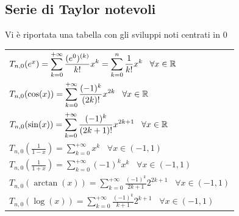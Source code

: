 \documentclass[10pt, letterpaper]{report}
\begin{document}
\subsection{Serie di Taylor notevoli}
Vi è riportata una tabella con gli sviluppi noti centrati in $0$\begin{center}
    \begin{tabular}{l}
        \rowcolor[HTML]{FFFFC7}
        $T_{n,0}(e^x)=\displaystyle \sum_{k=0}^{+\infty}\frac{(e^0)^{(k)}}{k!}x^k=\sum_{k=0}^n\frac{1}{k!}x^k\;\;\;\forall x \in {\mathbb R}$ \\
        \rowcolor[HTML]{EFEFEF}
        $T_{n,0}(\cos(x)) = \displaystyle \sum_{k=0}^{+\infty}\frac{(-1)^k}{(2k)!}x^{2k}\;\;\;\forall x \in {\mathbb R}$                      \\
        \rowcolor[HTML]{FFFFC7}
        $T_{n,0}(\sin(x)) = \displaystyle \sum_{k=0}^{+\infty}\frac{(-1)^k}{(2k+1)!}x^{2k+1}\;\;\;\forall x \in {\mathbb R}$                  \\
        \rowcolor[HTML]{EFEFEF}
        $T_{n,0}(\frac{1}{1-x}) = \displaystyle \sum_{k=0}^{+\infty}x^k\;\;\;\forall x \in (-1,1)$                                   \\
        \rowcolor[HTML]{FFFFC7}
        $T_{n,0}(\frac{1}{1+x}) = \displaystyle \sum_{k=0}^{+\infty}(-1)^kx^k\;\;\;\forall x \in (-1,1)$                             \\
        \rowcolor[HTML]{EFEFEF}
        $T_{n,0}(\arctan(x)) = \displaystyle \sum_{k=0}^{+\infty}\frac{(-1)^k}{2k+1}2^{2k+1}\;\;\;\forall x \in (-1,1)$              \\
        \rowcolor[HTML]{FFFFC7}
        $T_{n,0}(\log(x)) = \displaystyle \sum_{k=0}^{+\infty}\frac{(-1)^k}{k+1}2^{k+1}\;\;\;\forall x \in (-1,1)$
    \end{tabular}
\end{center}
\flowerLine
\end{document}
